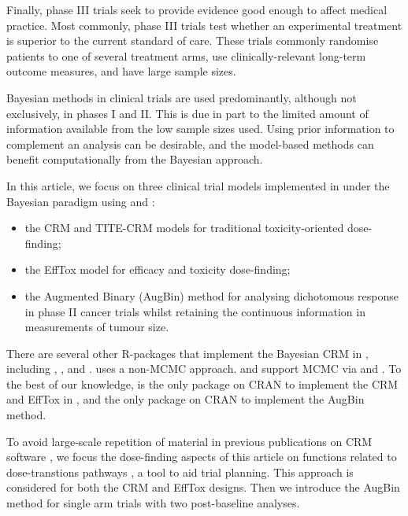 \documentclass[article]{jss}
\providecommand{\tightlist}{%
  \setlength{\itemsep}{0pt}\setlength{\parskip}{0pt}}
\begin{document}
Finally, phase III trials seek to provide evidence good enough to affect
medical practice. Most commonly, phase III trials test whether an
experimental treatment is superior to the current standard of care.
These trials commonly randomise patients to one of several treatment
arms, use clinically-relevant long-term outcome measures, and have large
sample sizes.

Bayesian methods in clinical trials are used predominantly, although not
exclusively, in phases I and II. This is due in part to the limited
amount of information available from the low sample sizes used. Using
prior information to complement an analysis can be desirable, and the
model-based methods can benefit computationally from the Bayesian
approach.

In this article, we focus on three clinical trial models implemented in
 under the Bayesian paradigm using  and
:

\begin{itemize}
\tightlist
\item
  the CRM and TITE-CRM models for traditional toxicity-oriented
  dose-finding;
\item
  the EffTox model for efficacy and toxicity dose-finding;
\item
  the Augmented Binary (AugBin) method \citep{Wason2013} for analysing
  dichotomous response in phase II cancer trials whilst retaining the
  continuous information in measurements of tumour size.
\end{itemize}

There are several other R-packages that implement the Bayesian CRM in
, including  \citep{dfcrm, Cheung2011},
 \citep{bcrm}, and  \citep{crmPack}. 
uses a non-MCMC approach.  and  support MCMC via
 and . To the best of our knowledge,
 is the only package on CRAN to implement the CRM and EffTox
in , and the only package on CRAN to implement the AugBin
method.

To avoid large-scale repetition of material in previous publications on
CRM software \citep{bcrm, Cheung2011}, we focus the dose-finding aspects
of this article on functions related to dose-transtions pathways
\citep{Yap2017, Brock2017a}, a tool to aid trial planning. This approach
is considered for both the CRM and EffTox designs. Then we introduce the
AugBin method for single arm trials with two post-baseline analyses.
\end{document}
